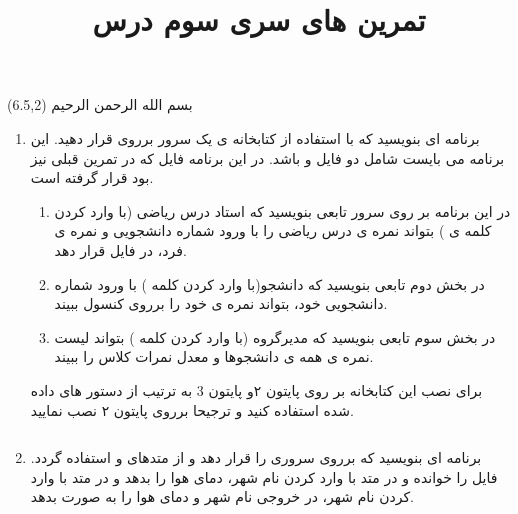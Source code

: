 \documentclass[oneside]{article}
\title{تمرین های سری سوم درس
\lr{Service Based Architecture}
}
\date{\vspace{-5ex}}
\newcommand{\inputcode}[2]{\inputminted[mathescape,%
                                                 linenos=true,%
                                                 formatcom=\small\setstretch{1}]{#1}{#2}}%
\begin{document}
\maketitle

\begin{textblock}{5}(6.5,2)\nastaliqfont
\noindent\Large
بسم الله الرحمن الرحیم
\end{textblock}

\begin{enumerate}
\item 
برنامه ای بنویسید که
با استفاده از کتابخانه ی
یک سرور
برروی 
قرار دهید.
این برنامه می بایست شامل دو فایل 
و 
باشد.
در این برنامه فایل 
که در تمرین قبلی نیز بود قرار گرفته است.
\begin{enumerate}
\item 
در این برنامه بر روی سرور تابعی بنویسید که استاد درس ریاضی (با وارد کردن کلمه ی 
) بتواند نمره ی درس ریاضی را با ورود شماره دانشجویی و نمره ی فرد، در فایل 
قرار دهد.
\item
در بخش دوم تابعی بنویسید که دانشجو(با وارد کردن کلمه 
) با ورود شماره دانشجویی خود، بتواند نمره ی خود را برروی کنسول ببیند.
\item
در بخش سوم تابعی بنویسید که مدیرگروه (با وارد کردن کلمه
)
بتواند لیست نمره ی همه ی دانشجوها و معدل نمرات کلاس را ببیند.
\end{enumerate}
برای نصب این کتابخانه بر روی پایتون ۲و پایتون
3
به ترتیب از دستور های داده شده استفاده کنید و ترجیحا برروی پایتون ۲ نصب نمایید.
\begin{latin}\inputcode{Text}{m.txt}\end{latin}
\item
برنامه ای بنویسید که 
برروی 
سروری را قرار دهد و از متدهای 
و
استفاده گردد.
فایل 
را خوانده و
در متد
با وارد کردن نام شهر،
دمای هوا را بدهد و در متد 
با وارد کردن نام شهر، 
در خروجی نام شهر و دمای هوا را به صورت  
بدهد.



\end{enumerate}

\end{document}
